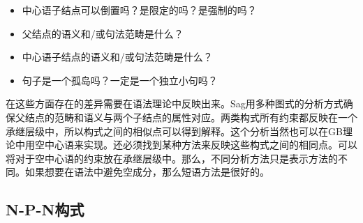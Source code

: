 \begin{exe}
\begin{xlist}[iv.]
\begin{exe}
\begin{xlist}[iv.]
\begin{itemize}
\item 中心语子结点可以倒置吗？是限定的吗？是强制的吗？
\item 父结点的语义和/或句法范畴是什么？
\item 中心语子结点的语义和/或句法范畴是什么？
\item 句子是一个孤岛吗？一定是一个独立小句吗？
\end{itemize}
在这些方面存在的差异需要在语法理论中反映出来。Sag用多种图式的分析方式确保父结点的范畴和语义与两个子结点的属性对应。两类构式所有约束都反映在一个承继层级中，所以构式之间的相似点可以得到解释。这个分析当然也可以在GB理论中用空中心语来实现。还必须找到某种方法来反映这些构式之间的相同点。可以将对于空中心语的约束放在承继层级中。那么，不同分析方法只是表示方法的不同。如果想要在语法中避免空成分，那么短语方法是很好的。

\subsection{N-P-N构式}
\label{Abschnitt-NPN-Konstruktion}


\end{xlist}
\end{exe}
\end{xlist}
\end{exe}
